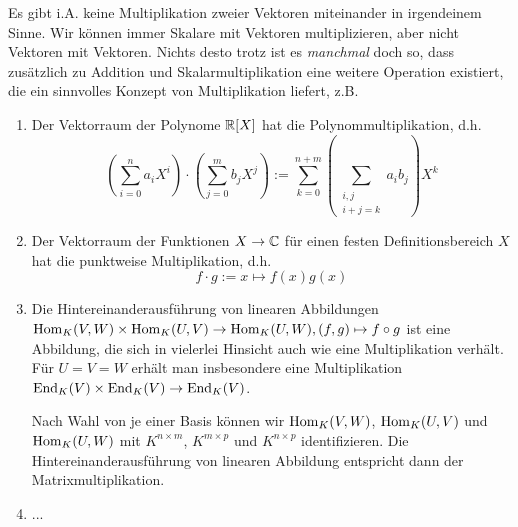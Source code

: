 \begin{remark}
	Es gibt i.A. keine Multiplikation zweier Vektoren miteinander in irgendeinem Sinne. Wir können immer Skalare mit Vektoren multiplizieren, aber nicht Vektoren mit Vektoren. Nichts desto trotz ist es \emph{manchmal} doch so, dass zusätzlich zu Addition und Skalarmultiplikation eine weitere Operation existiert, die ein sinnvolles Konzept von Multiplikation liefert, z.B.
	\begin{enumerate}
		\item Der Vektorraum der Polynome $\mathbb{R}[X]$ hat die Polynommultiplikation, d.h.
		\[\left(\sum_{i=0}^n a_i X^i\right) \cdot \left(\sum_{j=0}^m b_j X^j\right) := \sum_{k=0}^{n+m} (\sum_{\substack{i,j \\ i+j=k}} a_i b_j) X^k\]
		\item Der Vektorraum der Funktionen $X\to\mathbb{C}$ für einen festen Definitionsbereich $X$ hat die punktweise Multiplikation, d.h.
		\[f\cdot g := x\mapsto f(x)g(x)\]
		\item Die Hintereinanderausführung von linearen Abbildungen $\operatorname{Hom}_K(V,W) \times \operatorname{Hom}_K(U,V) \to \operatorname{Hom}_K(U,W), (f,g) \mapsto f\circ g$ ist eine Abbildung, die sich in vielerlei Hinsicht auch wie eine Multiplikation verhält. Für $U=V=W$ erhält man insbesondere eine Multiplikation $\operatorname{End}_K(V) \times \operatorname{End}_K(V) \to \operatorname{End}_K(V)$.
		
		Nach Wahl von je einer Basis können wir $\operatorname{Hom}_K(V,W)$, $\operatorname{Hom}_K(U,V)$ und $\operatorname{Hom}_K(U,W)$ mit $K^{n\times m}$, $K^{m\times p}$ und $K^{n\times p}$ identifizieren. Die Hintereinanderausführung von linearen Abbildung entspricht dann der Matrixmultiplikation.
		\item ...
	\end{enumerate}
	
\end{remark}

